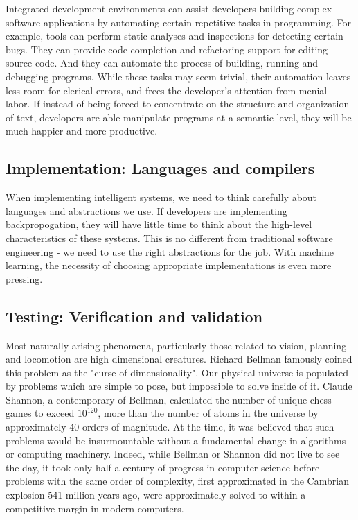 \documentclass[12pt,initial,twoside,maitrise]{dms}
\numberwithin{equation}{section}
\numberwithin{table}{chapter}
\numberwithin{figure}{chapter}
\begin{document}
Integrated development environments can assist developers building complex software applications by automating certain repetitive tasks in programming. For example, tools can perform static analyses and inspections for detecting certain bugs. They can provide code completion and refactoring support for editing source code. And they can automate the process of building, running and debugging programs. While these tasks may seem trivial, their automation leaves less room for clerical errors, and frees the developer's attention from menial labor. If instead of being forced to concentrate on the structure and organization of text, developers are able manipulate programs at a semantic level, they will be much happier and more productive.

\subsection{Implementation: Languages and compilers}

When implementing intelligent systems, we need to think carefully about languages and abstractions we use. If developers are implementing backpropogation, they will have little time to think about the high-level characteristics of these systems. This is no different from traditional software engineering - we need to use the right abstractions for the job. With machine learning, the necessity of choosing appropriate implementations is even more pressing.

\subsection{Testing: Verification and validation}

Most naturally arising phenomena, particularly those related to vision, planning and locomotion are high dimensional creatures. Richard Bellman famously coined this problem as the "curse of dimensionality". Our physical universe is populated by problems which are simple to pose, but impossible to solve inside of it. Claude Shannon, a contemporary of Bellman, calculated the number of unique chess games to exceed $10^{120}$, more than the number of atoms in the universe by approximately 40 orders of magnitude\cite{shannon1950xxii}. At the time, it was believed that such problems would be insurmountable without a fundamental change in algorithms or computing machinery. Indeed, while Bellman or Shannon did not live to see the day, it took only half a century of progress in computer science before problems with the same order of complexity, first approximated in the Cambrian explosion 541 million years ago, were approximately solved to within a competitive margin in modern computers.
\end{document}
